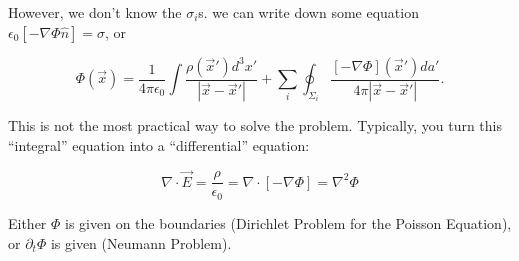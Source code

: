 \documentclass[a4paper,twoside,master.tex]{subfiles}
\begin{document}
However, we don't know the $\sigma_i$s. we can write down some equation $\epsilon_0[-\nabla\Phi\hat{n}] = \sigma$, or

\begin{equation}
    \Phi(\vec{x}) = \frac{1}{4\pi\epsilon_0}\int\frac{\rho(\vec{x}')d^3x'}{|\vec{x}-\vec{x}'|} + \sum_i\oint_{\Sigma_i}\frac{[-\nabla\Phi](\vec{x}')da'}{4\pi|\vec{x}-\vec{x}'|}.
\end{equation}

This is not the most practical way to solve the problem. Typically, you turn this ``integral'' equation into a ``differential'' equation:

\begin{equation}
    \nabla\cdot\vec{E} = \frac{\rho}{\epsilon_0}=\nabla\cdot[-\nabla\Phi] = \nabla^2\Phi
\end{equation}

Either $\Phi$ is given on the boundaries (Dirichlet Problem for the Poisson Equation), or $\partial_t\Phi$ is given (Neumann Problem).
\end{document}
